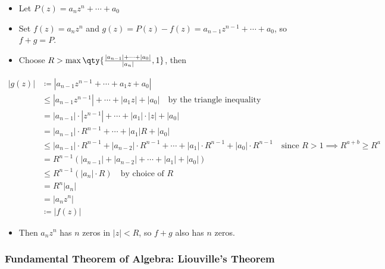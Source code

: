 \begin{itemize}
\tightlist
\item
  Let \(P(z) = a_nz^n + \cdots + a_0\)
\item
  Set \(f(z) = a_n z^n\) and
  \(g(z) = P(z) - f(z) = a_{n-1}z^{n-1} + \cdots + a_0\), so
  \(f+g = P\).
\item
  Choose
  \(R > \max\qty{ { {\left\lvert {a_{n-1}} \right\rvert} + \cdots + {\left\lvert {a_0} \right\rvert} \over {\left\lvert {a_n} \right\rvert} }, 1}\),
  then
\end{itemize}

\begin{align*} |g(z)|  &\coloneqq|a_{n-1}z^{n-1} + \cdots + a_1 z + a_0 | \\ &\leq |a_{n-1}z^{n-1}| + \cdots + |a_1 z| + |a_0 | \quad\text{by the triangle inequality} \\ &= |a_{n-1}|\cdot |z^{n-1}| + \cdots + |a_1|\cdot| z| + |a_0 | \\ &=  |a_{n-1}|\cdot R^{n-1} + \cdots + |a_1| R + |a_0 | \\ &\leq |a_{n-1}|\cdot R^{n-1}+|a_{n-2}|\cdot R^{n-1} + \cdots + |a_1| \cdot R^{n-1} + |a_0 |\cdot R^{n-1} \quad\text{since } R>1 \implies R^{a+b} \geq R^a \\ &= R^{n-1} \left( |a_{n-1}| + |a_{n-2}| + \cdots + |a_1| + |a_0| \right) \\ &\leq R^{n-1} \left( |a_n|\cdot R \right) \quad\text{by choice of } R   \\ &= R^{n} |a_n| \\ &= |a_n z^n| \\ &\coloneqq|f(z)| \end{align*}

\begin{itemize}
\tightlist
\item
  Then \(a_n z^n\) has \(n\) zeros in
  \({\left\lvert {z} \right\rvert} < R\), so \(f+g\) also has \(n\)
  zeros.
\end{itemize}

\hypertarget{fundamental-theorem-of-algebra-liouvilles-theorem}{%
\subsubsection{Fundamental Theorem of Algebra: Liouville's
Theorem}\label{fundamental-theorem-of-algebra-liouvilles-theorem}}

